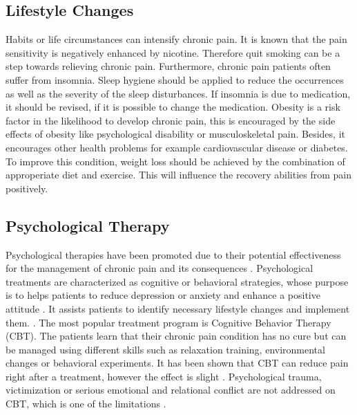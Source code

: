 \subsection{Lifestyle Changes}
Habits or life circumstances can intensify chronic pain. It is known that the pain sensitivity is negatively enhanced by nicotine. Therefore quit smoking can be a step towards relieving chronic pain.
Furthermore, chronic pain patients often suffer from insomnia. Sleep hygiene should be applied to reduce the occurrences as well as the severity of the sleep disturbances. If insomnia is due to medication, it should be revised, if it is possible to change the medication.
Obesity is a risk factor in the likelihood to  develop chronic pain, this is encouraged by the side effects of obesity like psychological disability or musculoskeletal pain. Besides, it encourages other health problems for example cardiovascular disease or diabetes. To improve this condition, weight loss should be achieved by the combination of approperiate diet and exercise. This will influence the recovery abilities from pain positively. \cite{marcus2009,pope2017}

\subsection{Psychological Therapy}

Psychological therapies have been promoted due to their potential effectiveness for the management of chronic pain and its consequences \cite{Eccleston2002}. Psychological treatments are characterized as cognitive or behavioral strategies, whose purpose is to helps patients to reduce depression or anxiety and enhance a positive attitude \cite{Eccleston2013}. It assists patients to identify necessary lifestyle changes and implement them. \cite{marcus2009,pope2017}. The most popular treatment program is Cognitive Behavior Therapy (CBT). The patients learn that their chronic pain condition has no cure but can be managed using different skills such as relaxation training, environmental changes or behavioral experiments. \cite{Burger2016} It has been shown that CBT can reduce pain right after a treatment, however the effect is slight \cite{Eccleston2013}. Psychological trauma, victimization or serious emotional and relational conflict are not addressed on CBT, which is one of the limitations \cite{Burger2016}.


